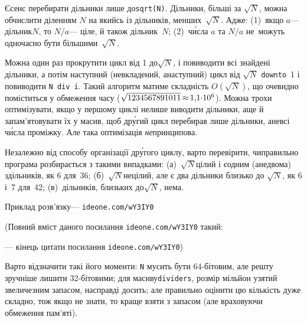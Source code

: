 \documentclass[14pt,a4paper]{extarticle}
\def\dib#1{\,#1\discretionary{}{\mbox{$#1$}}{}\,}
\renewcommand{\baselinestretch}{1.3125}
\begin{document}
\label{text:about-sqrt-n-in-divisors-list}
Є\nolinebreak[3] сенс перебирати дільники лише до\nolinebreak[2] \verb"sqrt(N)". Дільники, більші за $\sqrt{N}$, можна обчислити діленням $N$ на якийсь із дільників, менших~$\sqrt{N}$. Адже: (1)~якщо $a$\nolinebreak[3] --- дільник\nolinebreak[3] $N$, то $N/a$\nolinebreak[3] --- ціле, й також дільник~$N$; (2)~ч\'{и}сла $a$ та $N/a$ не~можуть одночасно бути більшими~$\sqrt{N}$. 

Можна один раз прокрутити цикл від 1 до\nolinebreak[3] $\sqrt{N}$, і повиводити всі знайдені дільники, а потім наступний (не\nolinebreak[3] вкладений, а\nolinebreak[3] наступний) цикл від $\sqrt{N}$ \texttt{downto}~1 і повиводити \verb"N div i". Такий алгоритм матиме складність $O(\sqrt{N})$, що очевидно поміститься у обмеження часу ($\sqrt{1234567891011}\dib{{\approx}}{1{,}1{\cdot}10^6}$). Можна трохи оптимізувати, якщо у першому циклі не\nolinebreak[3] лише виводити дільники, а\nolinebreak[3] ще й запам'ятовувати їх у масив, щоб др\'{у}гий цикл перебирав лише дільники, а\nolinebreak[3] не\nolinebreak[3] всі ч\'{и}сла проміжку. Але така оптимізація \emph{не}\nolinebreak[3] принципова.

Незалежно від способу організації др\'{у}гого циклу, варто перевірити, чи\nolinebreak[3] правильно програма розбирається з такими випадками: (а)~$\sqrt{N}$\nolinebreak[1] цілий і є\nolinebreak[2] одним (а\nolinebreak[3] не\nolinebreak[3] двома) з\nolinebreak[2] дільників, як 6 для~36;
(б)~$\sqrt{N}$\nolinebreak[1] не\nolinebreak[3] цілий, але є два дільники близько до $\sqrt{N}$, як 6 і~7 для~42;
(в)~дільників, близьких до\nolinebreak[3] $\sqrt{N}$, нема.

Приклад розв'язку\nolinebreak[3] --- 
\verb"ideone.com/wY3IY0"


{\color{green}\begin{small}

\renewcommand{\baselinestretch}{0.875}

(Повний вміст даного посилання \verb"ideone.com/wY3IY0" такий:

--- кінець цитати посилання \verb"ideone.com/wY3IY0")

\end{small}}


\hspace{0.5emplus 1em}
Варто відзначити такі його моменти: \texttt{N} мусить бути 64-\nolinebreak[3]бітовим, але решту зручніше лишити 32-\nolinebreak[3]бітовими;
для масиву\nolinebreak[3] \texttt{dividers}, розмір мільйон узятий з\nolinebreak[3] величезним запасом, насправді досить; але правильно оцінити цю кількість дуже складно, тож якщо не знати, то краще взяти з запасом (але враховуючи обмеження пам'яті).
\end{document}

